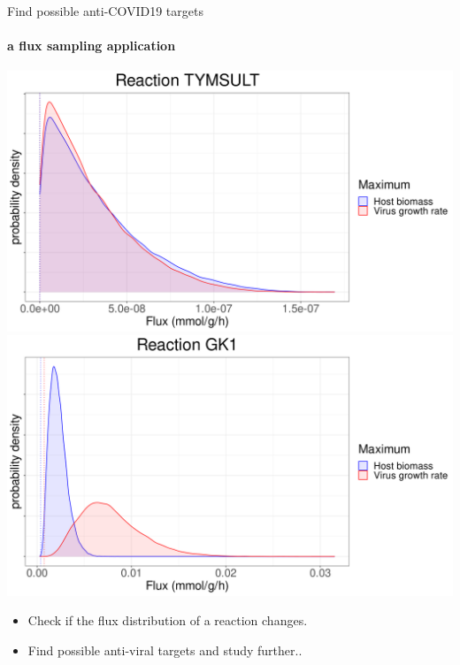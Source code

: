 \documentclass{beamer}
\begin{document}
   \begin{frame}{Find possible anti-COVID19 targets}
      \framesubtitle{a flux sampling application}      

      \centerline{
      \includegraphics[scale=0.21]{
         ../resources/density_flux_TYMSULT_fba_2_transparent
         } 
      \includegraphics[scale=0.21]{
         ../resources/density_flux_gk1_fba_2_transparent
         }
      }

      \begin{itemize}
         \item Check if the flux distribution of a reaction changes.
         \item Find possible anti-viral targets and study further..
      \end{itemize}
      \vspace*{0.2cm}

   \end{frame}
   

      
\end{document}
